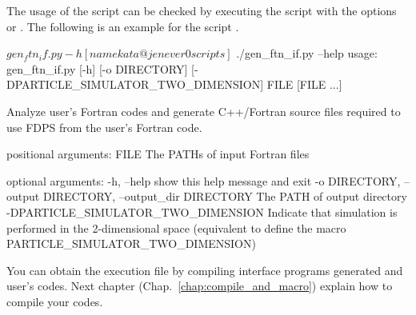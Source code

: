 The usage of the script can be checked by executing the script with the options  or . The following is an example for the script .
\begin{screen}
\begin{spverbatim}
$ gen_ftn_if.py -h
[namekata@jenever0 scripts]$ ./gen_ftn_if.py --help
usage: gen_ftn_if.py [-h] [-o DIRECTORY] [-DPARTICLE_SIMULATOR_TWO_DIMENSION]
                     FILE [FILE ...]

Analyze user's Fortran codes and generate C++/Fortran source files required to use FDPS from the user's Fortran code.

positional arguments:
  FILE                  The PATHs of input Fortran files

optional arguments:
  -h, --help            show this help message and exit
  -o DIRECTORY, --output DIRECTORY, --output_dir DIRECTORY
                        The PATH of output directory
  -DPARTICLE_SIMULATOR_TWO_DIMENSION
                        Indicate that simulation is performed
                        in the 2-dimensional space (equivalent
                        to define the macro 
                        PARTICLE_SIMULATOR_TWO_DIMENSION)
\end{spverbatim}
\end{screen}

You can obtain the execution file by compiling interface programs generated and user's codes. Next chapter (Chap.~\ref{chap:compile_and_macro}) explain how to compile your codes.

